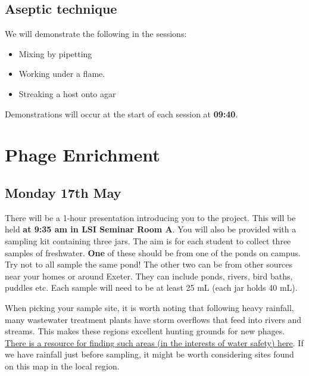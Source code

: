 \documentclass[
]{book}
\providecommand{\tightlist}{%
  \setlength{\itemsep}{0pt}\setlength{\parskip}{0pt}}
\begin{document}
\hypertarget{aseptic-technique}{%
\section*{Aseptic technique}\label{aseptic-technique}}

We will demonstrate the following in the sessions:

\begin{itemize}
\tightlist
\item
  Mixing by pipetting
\item
  Working under a flame.
\item
  Streaking a host onto agar
\end{itemize}

Demonstrations will occur at the start of each session at \textbf{09:40}.

\hypertarget{phage-enrichment}{%
\chapter{Phage Enrichment}\label{phage-enrichment}}

\hypertarget{monday-17th-may}{%
\section{Monday 17th May}\label{monday-17th-may}}

There will be a 1-hour presentation introducing you to the project. This will be held \textbf{at 9:35 am in LSI Seminar Room A}. You will also be provided with a sampling kit containing three jars. The aim is for each student to collect three samples of freshwater. \textbf{One} of these should be from one of the ponds on campus. Try not to all sample the same pond! The other two can be from other sources near your homes or around Exeter. They can include ponds, rivers, bird baths, puddles etc. Each sample will need to be at least 25 mL (each jar holds 40 mL).

When picking your sample site, it is worth noting that following heavy rainfall, many wastewater treatment plants have storm overflows that feed into rivers and streams. This makes these regions excellent hunting grounds for new phages. \href{https://arcg.is/1He0XL}{There is a resource for finding such areas (in the interests of water safety) here}. If we have rainfall just before sampling, it might be worth considering sites found on this map in the local region.
\end{document}
